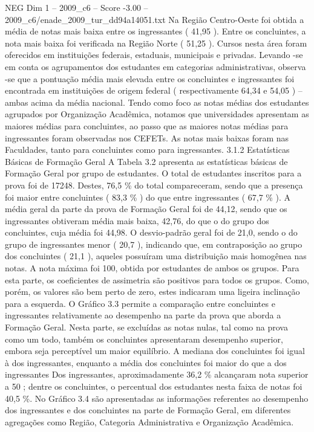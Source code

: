 \begin{textsample}{NEG Dim 1 – 2009\_c6 – Score -3.00 – 2009\_c6/enade\_2009\_tur\_dd94a14051.txt}
Na Região Centro-Oeste foi obtida a média de notas mais baixa entre os ingressantes ( 41,95 ).
Entre os concluintes, a nota mais baixa foi verificada na Região Norte ( 51,25 ).
Cursos nesta área foram oferecidos em instituições federais, estaduais, municipais e privadas.
Levando -se em conta os agrupamentos dos estudantes em categorias administrativas, observa -se que a pontuação média mais elevada entre os concluintes e ingressantes foi encontrada em instituições de origem federal ( respectivamente 64,34 e 54,05 ) – ambas acima da média nacional.
Tendo como foco as notas médias dos estudantes agrupados por Organização Acadêmica, notamos que universidades apresentam as maiores médias para concluintes, ao passo que as maiores notas médias para ingressantes foram observadas nos CEFETs.
As notas mais baixas foram nas Faculdades, tanto para concluintes como para ingressantes. 3.1.2 Estatísticas Básicas de Formação Geral A Tabela 3.2 apresenta as estatísticas básicas de Formação Geral por grupo de estudantes.
O total de estudantes inscritos para a prova foi de 17248.
Destes, 76,5 \% do total compareceram, sendo que a presença foi maior entre concluintes ( 83,3 \% ) do que entre ingressantes ( 67,7 \% ).
A média geral da parte da prova de Formação Geral foi de 44,12, sendo que os ingressantes obtiveram média mais baixa, 42,76, do que o do grupo dos concluintes, cuja média foi 44,98.
O desvio-padrão geral foi de 21,0, sendo o do grupo de ingressantes menor ( 20,7 ), indicando que, em contraposição ao grupo dos concluintes ( 21,1 ), aqueles possuíram uma distribuição mais homogênea nas notas.
A nota máxima foi 100, obtida por estudantes de ambos os grupos.
Para esta parte, os coeficientes de assimetria são positivos para todos os grupos.
Como, porém, os valores são bem perto de zero, estes indicaram uma ligeira inclinação para a esquerda.
O Gráfico 3.3 permite a comparação entre concluintes e ingressantes relativamente ao desempenho na parte da prova que aborda a Formação Geral.
Nesta parte, se excluídas as notas nulas, tal como na prova como um todo, também os concluintes apresentaram desempenho superior, embora seja perceptível um maior equilíbrio.
A mediana dos concluintes foi igual à dos ingressantes, enquanto a média dos concluintes foi maior do que a dos ingressantes Dos ingressantes, aproximadamente 36,2 \% alcançaram nota superior a 50 ; dentre os concluintes, o percentual dos estudantes nesta faixa de notas foi 40,5 \%.
No Gráfico 3.4 são apresentadas as informações referentes ao desempenho dos ingressantes e dos concluintes na parte de Formação Geral, em diferentes agregações como Região, Categoria Administrativa e Organização Acadêmica.

\end{textsample}
